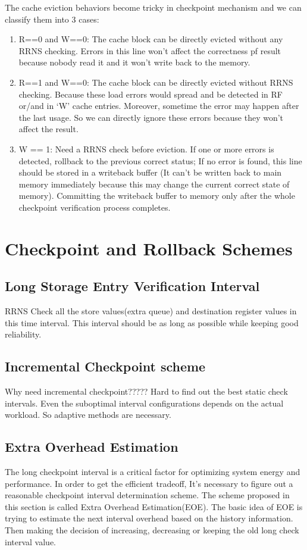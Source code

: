 \documentclass{sig-alternate}
\begin{document}
The cache eviction behaviors become tricky in checkpoint mechanism and we can classify them into 3 cases: 
\begin{enumerate}
\item R==0 and W==0: The cache block can be directly evicted without any RRNS checking. Errors in this line won't affect the correctness pf result because nobody read it and it won't write back to the memory.  
\item R==1 and W==0: The cache block can be directly evicted without RRNS checking. Because these load errors would spread and be detected in RF or/and in `W' cache entries. Moreover, sometime the error may happen after the last usage. So we can directly ignore these errors because they won't affect the result.  
\item W == 1: Need a RRNS check before eviction. If one or more errors is detected, rollback to the previous correct status; If no error is found, this line should be stored in a writeback buffer (It can't be written back to main memory immediately because this may change the current correct state of memory). Committing the writeback buffer to memory only after the whole checkpoint verification process completes.   
\end{enumerate}

\section{Checkpoint and Rollback Schemes}
\label{Chptschemes}
\subsection{Long Storage Entry Verification Interval}
RRNS Check all the store values(extra queue) and destination register values in this time interval. This interval should be as long as possible while keeping good reliability. 
\subsection{Incremental Checkpoint scheme}
 \label{Inc_chpt}
Why need incremental checkpoint?????
Hard to find out the best static check intervals. Even the suboptimal interval configurations depends on the actual workload. So adaptive methods are necessary.

\subsection{Extra Overhead Estimation}
The long checkpoint interval is a critical factor for optimizing system energy and performance. In order to get the efficient tradeoff, It's necessary to figure out a reasonable checkpoint interval determination scheme. The scheme proposed in this section is called Extra Overhead Estimation(EOE). The basic idea of EOE is trying to estimate the next interval overhead based on the history information. Then making the decision of increasing, decreasing or keeping the old long check interval value. 
\end{document}
